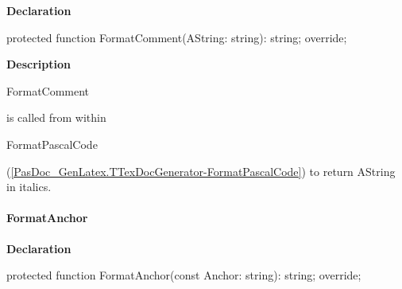 \documentclass{report}
\newif\ifpdf
\begin{document}
\label{PasDoc_GenLatex.TTexDocGenerator-FormatComment}
\begin{list}{}{
\setlength{\itemindent}{0cm}
\setlength{\listparindent}{0cm}
\setlength{\leftmargin}{\evensidemargin}
\addtolength{\leftmargin}{\tmplength}
\settowidth{\labelsep}{X}
\addtolength{\leftmargin}{\labelsep}
\setlength{\labelwidth}{\tmplength}
}
\item[\textbf{Declaration}\hfill]
\ifpdf
\begin{flushleft}
\fi
\begin{ttfamily}
protected function FormatComment(AString: string): string; override;\end{ttfamily}

\ifpdf
\end{flushleft}
\fi

\par
\item[\textbf{Description}]
\begin{ttfamily}FormatComment\end{ttfamily} is called from within \begin{ttfamily}FormatPascalCode\end{ttfamily}(\ref{PasDoc_GenLatex.TTexDocGenerator-FormatPascalCode}) to return AString in italics.

\end{list}
\paragraph*{FormatAnchor}\hspace*{\fill}

\label{PasDoc_GenLatex.TTexDocGenerator-FormatAnchor}
\begin{list}{}{
\setlength{\itemindent}{0cm}
\setlength{\listparindent}{0cm}
\setlength{\leftmargin}{\evensidemargin}
\addtolength{\leftmargin}{\tmplength}
\settowidth{\labelsep}{X}
\addtolength{\leftmargin}{\labelsep}
\setlength{\labelwidth}{\tmplength}
}
\item[\textbf{Declaration}\hfill]
\ifpdf
\begin{flushleft}
\fi
\begin{ttfamily}
protected function FormatAnchor(const Anchor: string): string; override;\end{ttfamily}

\ifpdf
\end{flushleft}
\fi

\end{list}
\end{document}

